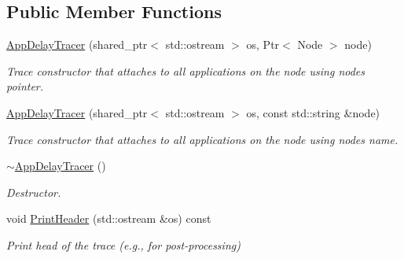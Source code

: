 \subsection*{Public Member Functions}
\begin{DoxyCompactItemize}
\item 
\hyperlink{classns3_1_1ndn_1_1AppDelayTracer_a15388726d82d36088e93bdb37c30cf4e}{App\+Delay\+Tracer} (shared\+\_\+ptr$<$ std\+::ostream $>$ os, Ptr$<$ Node $>$ node)
\begin{DoxyCompactList}\small\item\em Trace constructor that attaches to all applications on the node using node\textquotesingle{}s pointer. \end{DoxyCompactList}\item 
\hyperlink{classns3_1_1ndn_1_1AppDelayTracer_a4d45930f4de3ae93b0c4513607f67f09}{App\+Delay\+Tracer} (shared\+\_\+ptr$<$ std\+::ostream $>$ os, const std\+::string \&node)
\begin{DoxyCompactList}\small\item\em Trace constructor that attaches to all applications on the node using node\textquotesingle{}s name. \end{DoxyCompactList}\item 
\hyperlink{classns3_1_1ndn_1_1AppDelayTracer_acd8526f70557892d115daa86249119b9}{$\sim$\+App\+Delay\+Tracer} ()\hypertarget{classns3_1_1ndn_1_1AppDelayTracer_acd8526f70557892d115daa86249119b9}{}\label{classns3_1_1ndn_1_1AppDelayTracer_acd8526f70557892d115daa86249119b9}

\begin{DoxyCompactList}\small\item\em Destructor. \end{DoxyCompactList}\item 
void \hyperlink{classns3_1_1ndn_1_1AppDelayTracer_ad588c108a7f965851805c95a7f0b8fff}{Print\+Header} (std\+::ostream \&os) const
\begin{DoxyCompactList}\small\item\em Print head of the trace (e.\+g., for post-\/processing) \end{DoxyCompactList}\end{DoxyCompactItemize}

